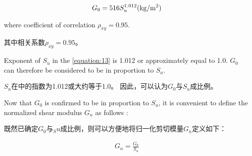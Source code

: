\begin{align}
    G_0=516S_u^{1.012}(\rm{kg/m^2})
    \label{equation:13}
\end{align}



\begin{paracol}{2}

    \noindent{}where coefficient of correlation $\rho_{xy}=0.95$.

    \switchcolumn
    
    \noindent{}其中相关系数$\rho_{xy}=0.95$。

    \switchcolumn*

    Exponent of $S_u$ in the \autoref{equation:13} is 1.012 or approximately equal to 1.0. $G_0$ can therefore be considered to be in proportion to $S_u$.

    \switchcolumn

    $S_u$在中的指数为1.012或大约等于1.0。 因此，可以认为$G_0$与$S_u$成比例。

\end{paracol}


\begin{paracol}{2}
    
    Now that $G_0$ is confirmed to be in proportion to $S_u$, it is convenient to define the normalized shear modulus $G_n$ as follows :

    \switchcolumn

    既然已确定$G_0$与$_Su$成比例，则可以方便地将归一化剪切模量$G_n$定义如下：

\end{paracol}

\begin{align}
    G_n=\frac{G_0}{S_u}
    \label{equation:14}
\end{align}

